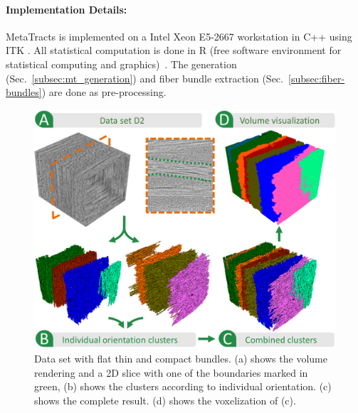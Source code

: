 \paragraph{Implementation Details:}MetaTracts is implemented on a Intel Xeon E5-2667 workstation in C++ using ITK \cite{Ibanez2005}. All statistical computation is done in R (free software environment for statistical computing and graphics)~\cite{RCT2013}. The \mt generation (Sec.~\ref{subsec:mt_generation}) and fiber bundle extraction (Sec.~\ref{subsec:fiber-bundles}) are done as pre-processing.
\begin{figure}[htb]
	\centering
	\includegraphics[width=\linewidth]{images/dataset2.eps}
	\caption{Data set with flat thin and compact bundles. (a) shows the volume rendering and a 2D slice with one of the boundaries marked in green, (b) shows the clusters according to individual orientation. (c) shows the complete result. (d) shows the voxelization of (c).}
	\label{fig:prepreg}
\end{figure} 